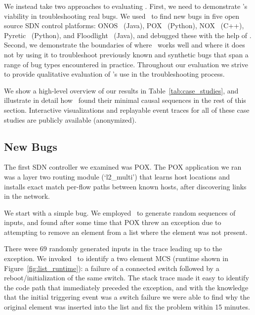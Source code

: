 We instead take two approaches to evaluating \projectname.
First, we need to demonstrate \projectname's viability in
troubleshooting real bugs. We used \projectname~to find new bugs in \num{five} open source
SDN control platforms:
ONOS~\cite{ONOS} (Java), POX~\cite{pox} (Python), NOX~\cite{nox} (C++),
Pyretic~\cite{frenetic} (Python), and Floodlight~\cite{bigswitch} (Java), and
debugged these with the help of \projectname. Second, we demonstrate the
boundaries of where \projectname~works well and where it does not by using it to
troubleshoot previously known and synthetic bugs that span a range of bug types encountered in
practice. Throughout our evaluation we strive to provide qualitative
evaluation of \projectname's use in the troubleshooting process.

We show a high-level overview
of our results in Table~\ref{tab:case_studies}, and
illustrate in detail how \projectname~found their minimal causal sequences
in the rest of this section. Interactive visualizations and replayable event traces
for all of these case studies are publicly available (anonymized).

\subsection{New Bugs}

 The first
SDN controller we examined was POX. %
The POX application we ran was a layer two routing module (`l2\_multi') that
learns host locations and installs exact match per-flow paths between known
hosts, after discovering links in the network. %

We start with a simple bug. %
We employed \projectname~to generate random sequences of
inputs, and found after some time that POX threw an exception due to
attempting to remove an element from a list where the element was not present.

There were $69$ randomly generated inputs in the trace leading up to the
exception. We invoked \projectname~to identify a two element MCS (runtime
shown in Figure~\ref{fig:list_runtime}):
a failure of a connected switch followed by a reboot/initialization of the same switch.
The stack trace made it easy to identify the code path that
immediately preceded the exception, and with
the knowledge that the initial triggering event was a switch failure we were able to
find why the original element was inserted into the list and fix the
problem within 15 minutes.

